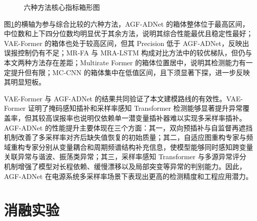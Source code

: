 \documentclass[bachelor, vlined]{DissertUESTC}
\begin{document}
\begin{figure}[!htbp]
    \caption{六种方法核心指标箱形图}
    \label{fig:new_model_boxplot}
    \end{figure}

    图\ref{fig:new_model_boxplot}的横轴为参与综合比较的六种方法，AGF-ADNet 的箱体整体位于最高区间，中位数和上下四分位数均明显优于其余方法，说明其综合性能最优且稳定性最好；VAE-Former 的箱体也处于较高区间，但其 Precision 低于 AGF-ADNet，反映出误报控制仍有不足；MR-FA 与 MRA-LSTM 构成对比方法中的较优梯队，但仍与本文两种方法存在差距；Multirate Former 的箱体位置居中，说明其检测能力有一定提升但有限；MC-CNN 的箱体集中在低值区间，且下须显著下探，进一步反映其明显短板。

    VAE-Former 与 AGF-ADNet 的结果共同验证了本文建模路线的有效性。VAE-Former 证明了掩码感知插补和采样率感知 Transformer 检测能够显著提升异常覆盖率，但其较高误报率也说明仅依赖单一潜变量插补器难以实现多采样率插补。AGF-ADNet 的性能提升主要体现在三个方面：其一，双向预插补与自监督再遮挡机制改善了多采样率对齐后缺失值恢复的初始质量；其二，自适应图重构专家与频域重构专家分别从变量耦合和周期频谱结构补充信息，使模型能够同时感知跨变量关联异常与谐波、振荡类异常；其三，采样率感知 Transformer 与多源异常评分机制增强了模型对长程依赖、缓慢漂移以及局部突变等异常的判别能力。因此，AGF-ADNet 在电源系统多采样率场景下表现出更高的检测精度和工程应用潜力。

    \clearpage

    \section{消融实验}
\end{document}
